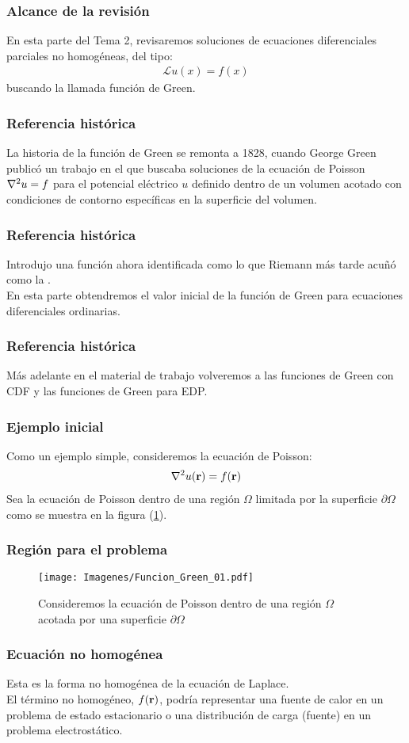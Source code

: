 \documentclass[12pt]{beamer}
\begin{document}
\begin{frame}
\frametitle{Alcance de la revisión}
En esta parte del Tema  2, revisaremos soluciones de ecuaciones diferenciales parciales no homogéneas, del tipo:
\pause
\begin{align*}
\mathcal{L} u (x) = f (x)
\end{align*}
buscando la llamada función de Green. 
\end{frame}
\begin{frame}
\frametitle{Referencia histórica}
La historia de la función de Green se remonta a 1828, cuando George Green publicó un trabajo en el que buscaba soluciones de la ecuación de Poisson $\laplacian{u} = f$ para el potencial eléctrico $u$ definido dentro de un volumen acotado con condiciones de contorno específicas en la superficie del volumen.
\end{frame}
\begin{frame}
\frametitle{Referencia histórica}
Introdujo una función ahora identificada como lo que Riemann más tarde acuñó como la .
\\
\bigskip
\pause
En esta parte obtendremos el valor inicial de la función de Green para ecuaciones diferenciales ordinarias.
\end{frame}
\begin{frame}
\frametitle{Referencia histórica}
Más adelante en el material de trabajo volveremos a las funciones de Green con CDF y las funciones de Green para EDP.
\end{frame}
\begin{frame}
\frametitle{Ejemplo inicial}
Como un ejemplo simple, consideremos la ecuación de Poisson:
\pause
\begin{align*}
\laplacian{u} (\vb{r}) = f (\vb{r})
\end{align*}
Sea la ecuación de Poisson dentro de una región $\Omega$ limitada por la superficie $\partial \Omega$ como se muestra en la figura (\ref{fig:figura_07_01}).
\end{frame}
\begin{frame}
\frametitle{Región para el problema}
\begin{figure}[H]
\centering
\texttt{[image: Imagenes/Funcion\_Green\_01.pdf]}
\caption{Consideremos la ecuación de Poisson dentro de una región $\Omega$ acotada por una superficie $\partial \Omega$}
\label{fig:figura_07_01}
\end{figure}
\end{frame}
\begin{frame}
\frametitle{Ecuación no homogénea}
Esta es la forma no homogénea de la ecuación de Laplace.
\\
\bigskip
\pause
El término no homogéneo, $f (\vb{r})$, podría representar una fuente de calor en un problema de estado estacionario o una distribución de carga (fuente) en un problema electrostático.
\end{frame}
\end{document}
